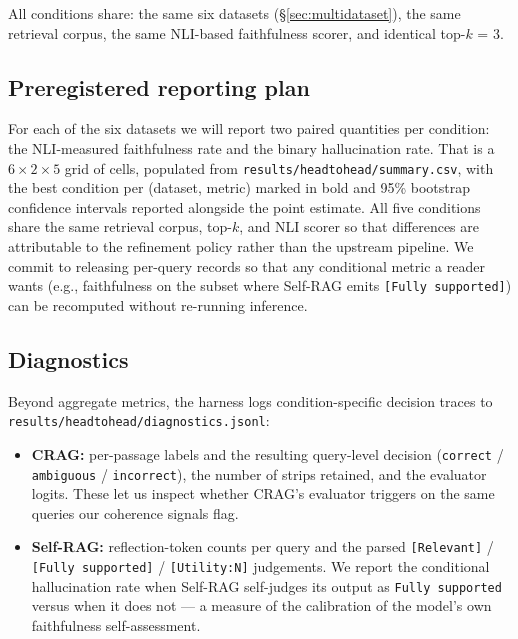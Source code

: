 All conditions share: the same six datasets (§\ref{sec:multidataset}),
the same retrieval corpus, the same NLI-based faithfulness scorer, and
identical top-$k$ = 3.

\subsection{Preregistered reporting plan}
\label{sec:headtohead_plan}

For each of the six datasets we will report two paired quantities per
condition: the NLI-measured faithfulness rate and the binary
hallucination rate. That is a $6 \times 2 \times 5$ grid of cells,
populated from \texttt{results/headtohead/summary.csv}, with the
best condition per (dataset, metric) marked in bold and 95\% bootstrap
confidence intervals reported alongside the point estimate. All five
conditions share the same retrieval corpus, top-$k$, and NLI scorer so
that differences are attributable to the refinement policy rather than
the upstream pipeline. We commit to releasing per-query records so that
any conditional metric a reader wants (e.g., faithfulness on the subset
where Self-RAG emits \texttt{[Fully supported]}) can be recomputed
without re-running inference.

\subsection{Diagnostics}

Beyond aggregate metrics, the harness logs condition-specific decision
traces to \texttt{results/headtohead/diagnostics.jsonl}:

\begin{itemize}
  \item \textbf{CRAG:} per-passage labels and the resulting query-level
        decision (\texttt{correct} / \texttt{ambiguous} /
        \texttt{incorrect}), the number of strips retained, and the
        evaluator logits. These let us inspect whether CRAG's evaluator
        triggers on the same queries our coherence signals flag.
  \item \textbf{Self-RAG:} reflection-token counts per query and the
        parsed \texttt{[Relevant]} / \texttt{[Fully supported]} /
        \texttt{[Utility:N]} judgements. We report the conditional
        hallucination rate when Self-RAG self-judges its output as
        \texttt{Fully supported} versus when it does not — a measure of
        the calibration of the model's own faithfulness self-assessment.
\end{itemize}

